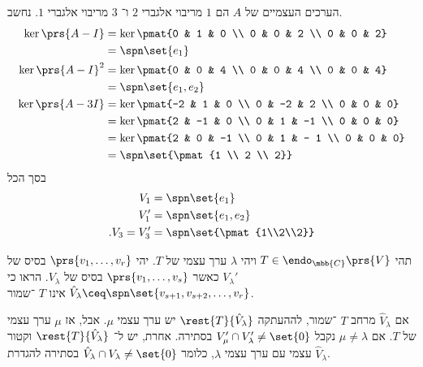 \documentclass[a4paper,10pt,oneside,openany]{article}
\begin{document}
\begin{solution}
הערכים העצמיים של
$A$
הם
$1$
מריבוי אלגברי
$2$
ו־%
$3$
מריבוי אלגברי
$1$.
נחשב.
\begin{align*}
\ker\prs{A-I} &= \ker\pmat{0 & 1 & 0 \\ 0 & 0 & 2 \\ 0 & 0 & 2}
\\&= \spn\set{e_1} \\
\ker\prs{A-I}^2 &= \ker\pmat{0 & 0 & 4 \\ 0 & 0 & 4 \\ 0 & 0 & 4}
\\&= \spn\set{e_1, e_2} \\
\ker\prs{A-3I} &= \ker\pmat{-2 & 1 & 0 \\ 0 & -2 & 2 \\ 0 & 0 & 0}
\\&= \ker\pmat{2 & -1 & 0 \\ 0 & 1 & -1 \\ 0 & 0 & 0}
\\&= \ker\pmat{2 & 0 & -1 \\ 0 & 1 & - 1 \\ 0 & 0 & 0}
\\&= \spn\set{\pmat{1 \\ 2 \\ 2}}
\end{align*}
בסך הכל
\begin{align*}
V_1 &= \spn\set{e_1} \\
V_1' &= \spn\set{e_1, e_2} \\
\text{.} V_3 = V_3' &= \spn\set{\pmat{1\\2\\2}}
\end{align*}
\end{solution}

\begin{exercise}
תהי
$T \in \endo_{\mbb{C}}\prs{V}$
ויהי
$\lambda$
ערך עצמי של
$T$.
יהי
$\prs{v_1, \ldots, v_r}$
בסיס של
$V_{\lambda}'$
כאשר
$\prs{v_1, \ldots, v_s}$
בסיס של
$V_\lambda$.
הראו כי
$\hat{V}_\lambda \ceq \spn\set{v_{s+1}, v_{s+2}, \ldots, v_r}$
אינו
$T$%
־שמור.
\end{exercise}

\begin{solution}
אם
$\hat{V}_\lambda$
מרחב
$T$%
־שמור, לההעתקה
$\rest{T}{\hat{V}_\lambda}$
יש ערך עצמי
$\mu$.
אבל, אז
$\mu$
ערך עצמי של
$T$.
אם
$\mu \neq \lambda$
נקבל
$V'_\mu \cap V'_\lambda \neq \set{0}$
בסתירה.
אחרת, יש ל־%
$\rest{T}{\hat{V}_\lambda}$
וקטור עצמי עם ערך עצמי
$\lambda$,
כלומר
$\hat{V}_\lambda \cap V_\lambda \neq \set{0}$
בסתירה להגדרת
$\hat{V}_\lambda$.
\end{solution}
\end{document}
